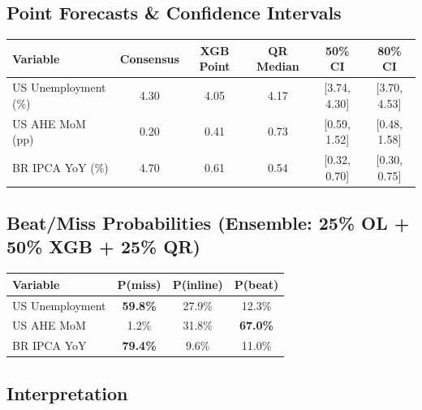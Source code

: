 \documentclass[11pt,a4paper]{article}
\begin{document}
\subsection*{Point Forecasts \& Confidence Intervals}

\begin{table}[H]
\centering\small
\begin{tabular}{lccccc}
\toprule
\textbf{Variable} & \textbf{Consensus} & \textbf{XGB Point} & \textbf{QR Median} & \textbf{50\% CI} & \textbf{80\% CI} \\
\midrule
US Unemployment (\%)  & 4.30 & 4.05 & 4.17 & [3.74, 4.30] & [3.70, 4.53] \\
US AHE MoM (pp)       & 0.20 & 0.41 & 0.73 & [0.59, 1.52] & [0.48, 1.58] \\
BR IPCA YoY (\%)      & 4.70 & 0.61 & 0.54 & [0.32, 0.70] & [0.30, 0.75] \\
\bottomrule
\end{tabular}
\end{table}

\subsection*{Beat/Miss Probabilities (Ensemble: 25\% OL + 50\% XGB + 25\% QR)}

\begin{table}[H]
\centering\small
\begin{tabular}{lccc}
\toprule
\textbf{Variable} & \textbf{P(miss)} & \textbf{P(inline)} & \textbf{P(beat)} \\
\midrule
US Unemployment  & \textbf{59.8\%} & 27.9\% & 12.3\% \\
US AHE MoM       & 1.2\% & 31.8\% & \textbf{67.0\%} \\
BR IPCA YoY      & \textbf{79.4\%} & 9.6\% & 11.0\% \\
\bottomrule
\end{tabular}
\end{table}

\subsection*{Interpretation}
\end{document}
